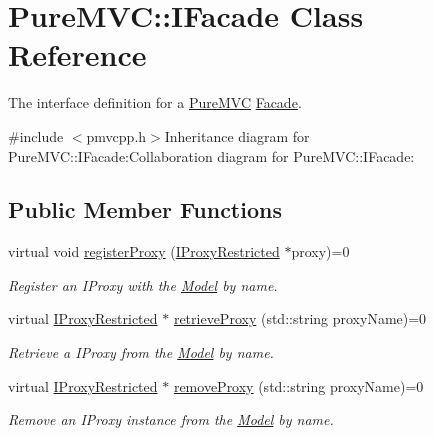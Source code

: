 \hypertarget{class_pure_m_v_c_1_1_i_facade}{
\section{PureMVC::IFacade Class Reference}
\label{class_pure_m_v_c_1_1_i_facade}
}


The interface definition for a \hyperlink{namespace_pure_m_v_c}{PureMVC} \hyperlink{class_pure_m_v_c_1_1_facade}{Facade}.  


{\ttfamily \#include $<$pmvcpp.h$>$}Inheritance diagram for PureMVC::IFacade:Collaboration diagram for PureMVC::IFacade:\subsection*{Public Member Functions}
\begin{DoxyCompactItemize}
\item 
virtual void \hyperlink{class_pure_m_v_c_1_1_i_facade_a510b704a75bb052bbccd816ac30a5df0}{registerProxy} (\hyperlink{class_pure_m_v_c_1_1_i_proxy_restricted}{IProxyRestricted} $\ast$proxy)=0
\begin{DoxyCompactList}\small\item\em Register an {\ttfamily IProxy} with the {\ttfamily \hyperlink{class_pure_m_v_c_1_1_model}{Model}} by name. \item\end{DoxyCompactList}\item 
virtual \hyperlink{class_pure_m_v_c_1_1_i_proxy_restricted}{IProxyRestricted} $\ast$ \hyperlink{class_pure_m_v_c_1_1_i_facade_a0af423a85df80b52acd106c5adf07318}{retrieveProxy} (std::string proxyName)=0
\begin{DoxyCompactList}\small\item\em Retrieve a {\ttfamily IProxy} from the {\ttfamily \hyperlink{class_pure_m_v_c_1_1_model}{Model}} by name. \item\end{DoxyCompactList}\item 
virtual \hyperlink{class_pure_m_v_c_1_1_i_proxy_restricted}{IProxyRestricted} $\ast$ \hyperlink{class_pure_m_v_c_1_1_i_facade_ad4bab4e894ac4acd0b0f790dda21e8fe}{removeProxy} (std::string proxyName)=0
\begin{DoxyCompactList}\small\item\em Remove an {\ttfamily IProxy} instance from the {\ttfamily \hyperlink{class_pure_m_v_c_1_1_model}{Model}} by name. \item\end{DoxyCompactList}\item 

\end{DoxyCompactItemize}
